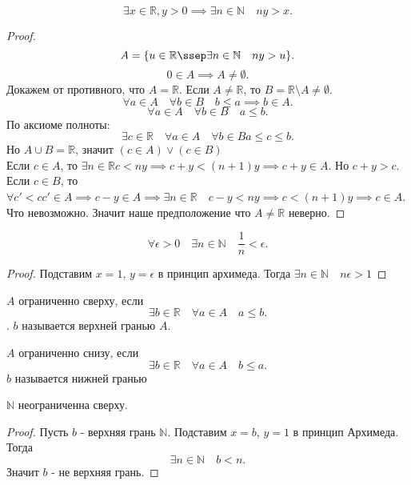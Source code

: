 \documentclass[11pt, oneside]{article}   	%
\begin{document}
\begin{theorem}
    \[ \exists{x \in \mathbb{R}, y > 0} \implies \exists{n \in \mathbb{N}}\quad ny>x .\]
    \begin{proof}
        \[ A = \{u \in \mathbb{R}\ssep \exists{n \in \mathbb{N}}\quad ny>u \}  .\]
        \[ 0 \in A \implies A \neq  \emptyset .\]
        Докажем от противного, что $A = \mathbb{R}$.
        Если $A \neq \mathbb{R}$, то $B = \mathbb{R}\setminus A \neq \emptyset$.
        \[ \forall{a \in A}\quad \forall{b \in B} \quad b\le a \implies b \in A .\] 
        \[ \forall{a \in A}\quad \forall{b \in B}\quad a\le b .\]
        По аксиоме полноты:
        \[ \exists{c \in \mathbb{R}}\quad \forall{a \in A}\quad \forall{b \in B} a \le c \le b .\]
        Но $A\cup B = \mathbb{R}$, значит $\left( c \in A  \right)\lor\left( c \in B \right)  $\\ 
        Если $c \in A$, то $\exists{n \in \mathbb{R}} c<ny \implies c+y< (n+1)y \implies c+y \in A$. Но $c+y>c$.\\
        Если  $c \in B$, то $\forall{c'<c } c' \in A \implies c-y \in A \implies \exists{n \in \mathbb{R}}\quad c-y < ny \implies c<(n+1)y \implies c \in A$. Что невозможно. Значит наше предположение что  $A \neq \mathbb{R}$ неверно.
    \end{proof}
    \end{theorem}
    \begin{tlemma}
        \[ \forall{\epsilon > 0}\quad \exists{n \in \mathbb{N}}\quad \frac{1}{n}<\epsilon  .\]
        \begin{proof}
            Подставим $x=1$,  $y=\epsilon$ в принцип архимеда. Тогда  $\exists{n \in \mathbb{N}}\quad n\epsilon > 1$
        \end{proof}
    \end{tlemma}
    \begin{definition}
        $A$ ограниченно сверху, если 
        \[ \exists{b \in \mathbb{R}}\quad \forall{a \in A}\quad a\le b  .\].
        $b$ называется верхней гранью  $A$.
    \end{definition}
    \begin{definition}
        $A$ ограниченно снизу, если 
        \[ \exists{b \in \mathbb{R}}\quad \forall{a \in A}\quad b\le a .\]
        $b$ называется нижней гранью
    \end{definition}
    \begin{tlemma}
        $\mathbb{N}$ неограниченна сверху.\\
        \begin{proof}
            Пусть $b$ - верхняя грань  $\mathbb{N}$. Подставим $x=b$,  $y=1$ в принцип Архимеда. Тогда 
            \[ \exists{n \in \mathbb{N}}\quad b<n .\]
            Значит $b$ -  не верхняя грань.
        \end{proof}
    \end{tlemma}
\end{document}
